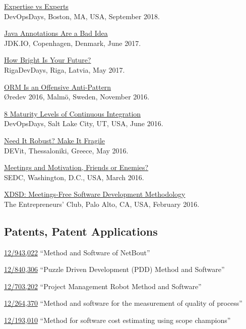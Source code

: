 \documentclass[12pt]{article}
\begin{document}
\href{https://youtu.be/KCx1o_lSMkI}{Expertise vs Experts}\\
DevOpsDays, Boston, MA, USA, September 2018.

\href{https://youtu.be/cv23Z6xpwDw}{Java Annotations Are a Bad Idea}\\
JDK.IO, Copenhagen, Denmark, June 2017.

\href{https://www.youtube.com/watch?v=IGbteQpTNCA}{How Bright Is Your Future?}\\
RigaDevDays, Riga, Latvia, May 2017.

\href{https://www.youtube.com/watch?v=03PXmPc7Q3g}{ORM Is an Offensive Anti-Pattern}\\
\O{}redev 2016, Malm\"o, Sweden, November 2016.

\href{https://www.youtube.com/watch?v=3dJP_LtUGgg}{8 Maturity Levels of Continuous Integration}\\
DevOpsDays, Salt Lake City, UT, USA, June 2016.

\href{https://www.youtube.com/watch?v=nCGBgI1MNwE}{Need It Robust? Make It Fragile}\\
DEVit, Thessaloniki, Greece, May 2016.

\href{https://www.youtube.com/watch?v=LB_YLWhGrco}{Meetings and Motivation, Friends or Enemies?}\\
SEDC, Washington, D.C., USA, March 2016.

\href{https://www.youtube.com/watch?v=qRZYJGYdrwk}{XDSD: Meetings-Free Software Development Methodology}\\
The Entrepreneurs' Club, Palo Alto, CA, USA, February 2016.

\subsection*{Patents, Patent Applications}

\href{https://patents.google.com/patent/US20120117164}{12/943,022}
``Method and Software of NetBout''

\href{https://patents.google.com/patent/US20120023476}{12/840,306}
``Puzzle Driven Development (PDD) Method and Software''

\href{https://patents.google.com/patent/US20110196798}{12/703,202}
``Project Management Robot Method and Software''

\href{https://patents.google.com/patent/US20100114638}{12/264,370}
``Method and software for the measurement of quality of process''

\href{https://patents.google.com/patent/US20100042968}{12/193,010}
``Method for software cost estimating using scope champions''
\end{document}
